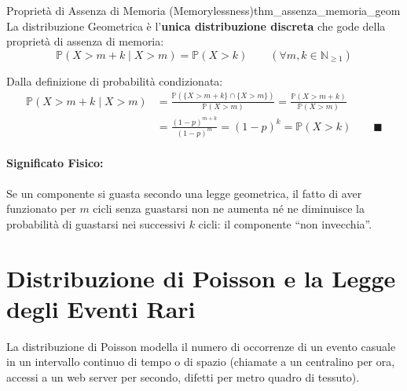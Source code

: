 \begin{teorema}{Proprietà di Assenza di Memoria (Memorylessness)}{thm_assenza_memoria_geom}
La distribuzione Geometrica è l'\textbf{unica distribuzione discreta} che gode della proprietà di assenza di memoria:
\begin{equation}
    \mathbb{P}(X > m + k \mid X > m) = \mathbb{P}(X > k) \qquad (\forall m, k \in \mathbb{N}_{\ge 1})
\end{equation}
\end{teorema}

\begin{dimostrazione}
Dalla definizione di probabilità condizionata:
\begin{align}
    \mathbb{P}(X > m + k \mid X > m) &= \frac{\mathbb{P}(\{X > m + k\} \cap \{X > m\})}{\mathbb{P}(X > m)} = \frac{\mathbb{P}(X > m + k)}{\mathbb{P}(X > m)} \\
    &= \frac{(1-p)^{m+k}}{(1-p)^m} = (1-p)^k = \mathbb{P}(X > k) \qquad \blacksquare
\end{align}
\end{dimostrazione}

\paragraph{Significato Fisico:}
Se un componente si guasta secondo una legge geometrica, il fatto di aver funzionato per $m$ cicli senza guastarsi non ne aumenta né ne diminuisce la probabilità di guastarsi nei successivi $k$ cicli: il componente ``non invecchia''.

\section{Distribuzione di Poisson e la Legge degli Eventi Rari}
\label{sec:poisson}

La distribuzione di Poisson modella il numero di occorrenze di un evento casuale in un intervallo continuo di tempo o di spazio (chiamate a un centralino per ora, accessi a un web server per secondo, difetti per metro quadro di tessuto).

